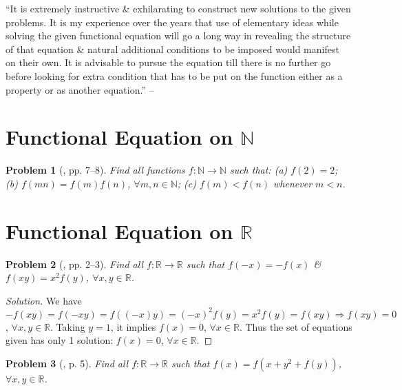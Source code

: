 \documentclass{article}
\newtheorem{problem}{Problem}
\begin{document}
``It is extremely instructive \& exhilarating to construct new solutions to the given problems. It is my experience over the years that use of elementary ideas while solving the given functional equation will go a long way in revealing the structure of that equation \& natural additional conditions to be imposed would manifest on their own. It is advisable to pursue the equation till there is no further go before looking for extra condition that has to be put on the function either as a property or as another equation.'' -- \cite[p. 5]{Venkatachala2013}


\section{Functional Equation on $\mathbb{N}$}

\begin{problem}[\cite{Venkatachala2013}, pp. 7--8]
	Find all functions $f:\mathbb{N}\to\mathbb{N}$ such that: (a) $f(2) = 2$; (b) $f(mn) = f(m)f(n)$, $\forall m,n\in\mathbb{N}$; (c) $f(m) < f(n)$ whenever $m < n$.
\end{problem}


\section{Functional Equation on $\mathbb{R}$}

\begin{problem}[\cite{Venkatachala2013}, pp. 2--3]
	Find all $f:\mathbb{R}\to\mathbb{R}$ such that $f(-x) = -f(x)$ \& $f(xy) = x^2f(y)$, $\forall x,y\in\mathbb{R}$.
\end{problem}

\begin{proof}[Solution]
	We have $-f(xy) = f(-xy) = f((-x)y) = (-x)^2f(y) = x^2f(y) = f(xy)\Rightarrow f(xy) = 0$, $\forall x,y\in\mathbb{R}$. Taking $y = 1$, it implies $f(x) = 0$, $\forall x\in\mathbb{R}$. Thus the set of equations given has only 1 solution: $f(x) = 0$, $\forall x\in\mathbb{R}$.
\end{proof}

\begin{problem}[\cite{Dung_cac_phuong_phap_giai_toan_qua_cac_ky_thi_olympic_2022}, p. 5]
	Find all $f:\mathbb{R}\to\mathbb{R}$ such that $f(x) = f(x + y^2 + f(y))$, $\forall x,y\in\mathbb{R}$.
\end{problem}
\end{document}
